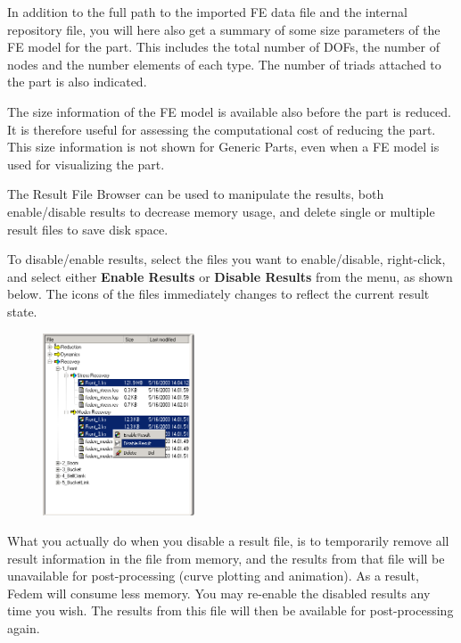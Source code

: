 \medskip\noindent
In addition to the full path to the imported FE data file and the internal
repository file, you will here also get a summary of some size parameters
of the FE model for the part. This includes the total number of DOFs,
the number of nodes and the number elements of each type.
The number of triads attached to the part is also indicated.

The size information of the FE model is available also before the part
is reduced. It is therefore useful for assessing the computational cost
of reducing the part. This size information is not shown for Generic Parts,
even when a FE model is used for visualizing the part.



The Result File Browser can be used to manipulate the results,
both enable/disable results to decrease memory usage,
and delete single or multiple result files to save disk space.


To disable/enable results, select the files you want to enable/disable,
right-click, and select either \textbf{Enable Results} or
\textbf{Disable Results} from the menu, as shown below. The icons of
the files immediately changes to reflect the current result state.

\begin{figure}
  \includegraphics[width=0.4\textwidth]{Figures/RFB-disable}
\end{figure}

What you actually do when you disable a result file, is to temporarily remove
all result information in the file from memory, and the results from that file
will be unavailable for post-processing (curve plotting and animation).
As a result, Fedem will consume less memory.
You may re-enable the disabled results any time you wish.
The results from this file will then be available for post-processing again.

